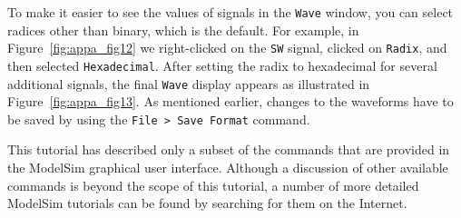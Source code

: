 \documentclass[11pt, twoside, pdftex]{article}
\newcommand{\commonPath}{../../../Common}
\begin{document}
\clearpage
\noindent
To make it easier to see the values of signals in the \texttt{Wave} window, you can select
radices other than binary, which is the default. For example, in
Figure~\ref{fig:appa_fig12} we right-clicked on the \texttt{SW} signal, clicked on
\texttt{Radix}, and then selected \texttt{Hexadecimal}. After setting the radix to
hexadecimal for several additional signals, the final \texttt{Wave} display appears as
illustrated in Figure~\ref{fig:appa_fig13}. As mentioned earlier, changes to the waveforms
have to be saved by using the \texttt{File > Save Format} command.

\noindent
This tutorial has described only a subset of the commands that are provided in the
ModelSim graphical user interface. Although a discussion of other available commands is 
beyond the scope of this tutorial, a number of more detailed ModelSim tutorials can be 
found by searching for them on the Internet.



\end{document}
